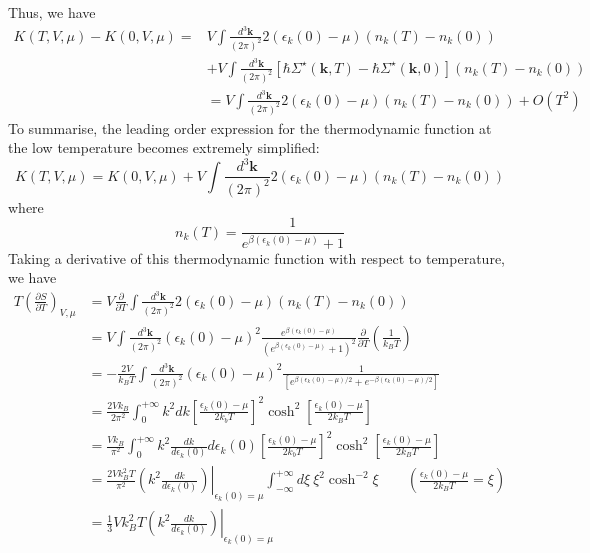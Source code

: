 Thus, we have
\begin{equation}
\begin{aligned}
K(T,V,\mu)-K(0,V,\mu)=&V\int \frac{d^3 \mathbf{k}}{(2\pi)^2} 2(\epsilon_k(0)-\mu) (n_k(T)-n_k(0))\\
&+V\int \frac{d^3 \mathbf{k}}{(2\pi)^2}  \left[\hbar \Sigma^\star (\mathbf{k},T) - \hbar \Sigma^\star (\mathbf{k},0) \right] (n_k(T)-n_k(0))\\
&=V\int \frac{d^3 \mathbf{k}}{(2\pi)^2} 2(\epsilon_k(0)-\mu) (n_k(T)-n_k(0))+O(T^2)
\end{aligned}
\end{equation}
 To summarise, the leading order expression for the thermodynamic function at the low temperature becomes extremely simplified:
\begin{equation} \tag{4.6.24}
K(T,V,\mu)=K(0,V,\mu)+V\int \frac{d^3 \mathbf{k}}{(2\pi)^2} 2(\epsilon_k(0)-\mu) (n_k(T)-n_k(0))
\end{equation}
where
\begin{equation}\tag{4.6.24'}
n_k(T)=\frac{1}{e^{\beta(\epsilon_k(0)-\mu)}+1}
\end{equation}
 Taking a derivative of this thermodynamic function with respect to temperature, we have
\[
\begin{aligned}
T\left( \frac{\partial S}{\partial T} \right)_{V,\mu}&=V\frac{\partial}{\partial T} \int \frac{d^3 \mathbf{k}}{(2\pi)^2} 2(\epsilon_k(0)-\mu) (n_k(T)-n_k(0))\\
&=V \int \frac{d^3 \mathbf{k}}{(2\pi)^2} (\epsilon_k(0)-\mu)^2 \frac{e^{\beta(\epsilon_k(0)-\mu)}}{\left(e^{\beta(\epsilon_k(0)-\mu)}+1\right)^2} \frac{\partial}{\partial T} \left( \frac{1}{k_B T} \right)\\
&=-\frac{2V}{k_B T} \int \frac{d^3 \mathbf{k}}{(2\pi)^2} (\epsilon_k(0)-\mu)^2 \frac{1}{\left[ e^{\beta(\epsilon_k(0)-\mu)/2} +e^{-\beta(\epsilon_k(0)-\mu)/2} \right]}\\
&=\frac{2V k_B}{2\pi^2} \int_0^{+\infty} k^2 dk \left[ \frac{\epsilon_k(0)-\mu}{2k_b T} \right]^2 \cosh^2 \left[ \frac{\epsilon_k(0)-\mu}{2k_B T} \right]\\
&=\frac{V k_B}{\pi^2}  \int_0^{+\infty} k^2 \frac{dk}{d\epsilon_k(0)} d\epsilon_k(0) \left[ \frac{\epsilon_k(0)-\mu}{2k_b T} \right]^2 \cosh^2 \left[ \frac{\epsilon_k(0)-\mu}{2k_B T} \right]\\
&=\frac{2V k_B^2 T}{\pi^2} \left. \left( k^2 \frac{dk}{d\epsilon_k(0)} \right) \right|_{\epsilon_k(0)=\mu} \int_{-\infty}^{+\infty} d\xi \ \xi^2 \cosh^{-2} \xi\qquad 
\left( \frac{\epsilon_k(0)-\mu}{2k_B T}=\xi \right)\\
&=\frac{1}{3}V k_B^2 T \left. \left( k^2 \frac{dk}{d\epsilon_k(0)} \right) \right|_{\epsilon_k(0)=\mu} 
\end{aligned}
\]
